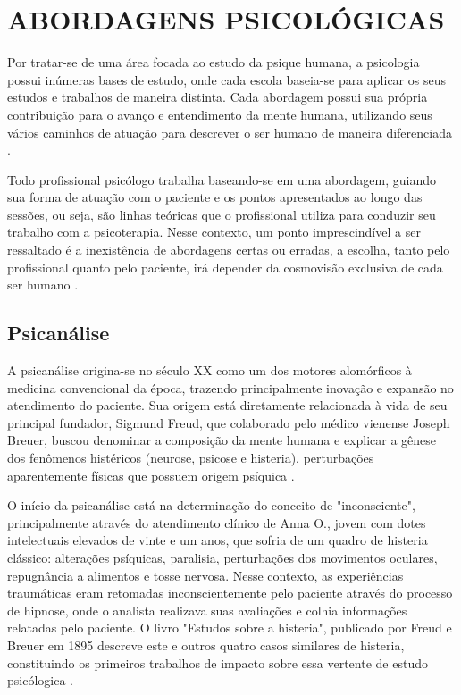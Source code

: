 \section{ABORDAGENS PSICOLÓGICAS}
\label{sec:abordagensPsicologicas}

Por tratar-se de uma área focada ao estudo da psique humana, a psicologia possui inúmeras bases de estudo, onde cada escola baseia-se para aplicar os seus estudos e trabalhos de maneira distinta. Cada abordagem possui sua própria contribuição para o avanço e entendimento da mente humana, utilizando seus vários caminhos de atuação para descrever o ser humano de maneira diferenciada \cite{Anhanguera2022}.

Todo profissional psicólogo trabalha baseando-se em uma abordagem, guiando sua forma de atuação com o paciente e os pontos apresentados ao longo das sessões, ou seja, são linhas teóricas que o profissional utiliza para conduzir seu trabalho com a psicoterapia. Nesse contexto, um ponto imprescindível a ser ressaltado é a inexistência de abordagens certas ou erradas, a escolha, tanto pelo profissional quanto pelo paciente, irá depender da cosmovisão exclusiva de cada ser humano \cite{Barros2022}.

\subsection{Psicanálise}
\label{sec:psicanalise}
A psicanálise origina-se no século XX como um dos motores alomórficos à medicina convencional da época, trazendo principalmente inovação e expansão no atendimento do paciente. Sua origem está diretamente relacionada à vida de seu principal fundador, Sigmund Freud, que colaborado pelo médico vienense Joseph Breuer, buscou denominar a composição da mente humana e explicar a gênese dos fenômenos histéricos (neurose, psicose e histeria), perturbações aparentemente físicas que possuem origem psíquica \cite{Clinica2017}.

O início da psicanálise está na determinação do conceito de "inconsciente", principalmente através do atendimento clínico de Anna O., jovem com dotes intelectuais elevados de vinte e um anos, que sofria de um quadro de histeria clássico: alterações psíquicas, paralisia, perturbações dos movimentos oculares, repugnância a alimentos e tosse nervosa. Nesse contexto, as experiências traumáticas eram retomadas inconscientemente pelo paciente através do processo de hipnose, onde o analista realizava suas avaliações e colhia informações relatadas pelo paciente. O livro "Estudos sobre a histeria", publicado por Freud e Breuer em 1895 descreve este e outros quatro casos similares de histeria, constituindo os primeiros trabalhos de impacto sobre essa vertente de estudo psicólogica \cite{Clinica2017}.

